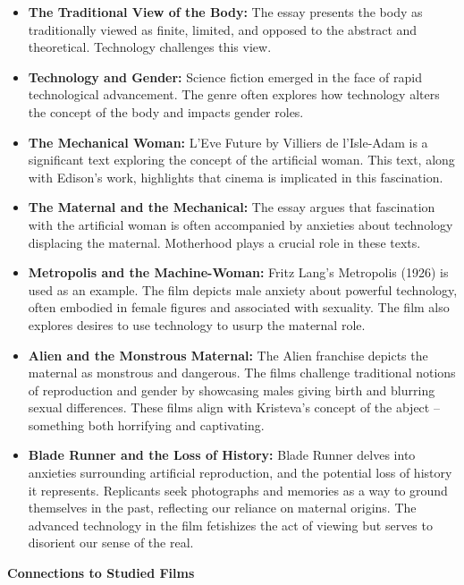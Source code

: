 \documentclass[11pt,fleqn]{book} %
\begin{document}
\begin{itemize}
\item \textbf{The Traditional View of the Body:}  The essay presents the body as traditionally viewed as finite, limited, and opposed to the abstract and theoretical. Technology challenges this view. 
\item \textbf{Technology and Gender:} Science fiction emerged in the face of rapid technological advancement. The genre often explores how technology alters the concept of the body and impacts gender roles.
\item \textbf{The Mechanical Woman:}  L'Eve Future by Villiers de l’Isle-Adam is a significant text exploring the concept of the artificial woman.  This text, along with Edison's work, highlights that cinema is implicated in this fascination.
\item  \textbf{The Maternal and the Mechanical:} The essay argues that fascination with the artificial woman is often accompanied by anxieties about technology displacing the maternal. Motherhood plays a crucial role in these texts. 
\item \textbf{Metropolis and the Machine-Woman:} Fritz Lang's Metropolis (1926) is used as an example. The film depicts male anxiety about powerful technology, often embodied in female figures and associated with sexuality. The film also explores desires to use technology to usurp the maternal role.
\item \textbf{Alien and the Monstrous Maternal:} The Alien franchise depicts the maternal as monstrous and dangerous. The films challenge traditional notions of reproduction and gender by showcasing males giving birth and blurring sexual differences. These films align with Kristeva's concept of the abject – something both horrifying and captivating. 
\item \textbf{Blade Runner and the Loss of History:}  Blade Runner delves into anxieties surrounding artificial reproduction, and the potential loss of history it represents. Replicants seek photographs and memories as a way to ground themselves in the past, reflecting our reliance on maternal origins. The advanced technology in the film fetishizes the act of viewing but serves to disorient our sense of the real.
\end{itemize} 
\vspace{5pt} 

\textbf{Connections to Studied Films}
\end{document}
